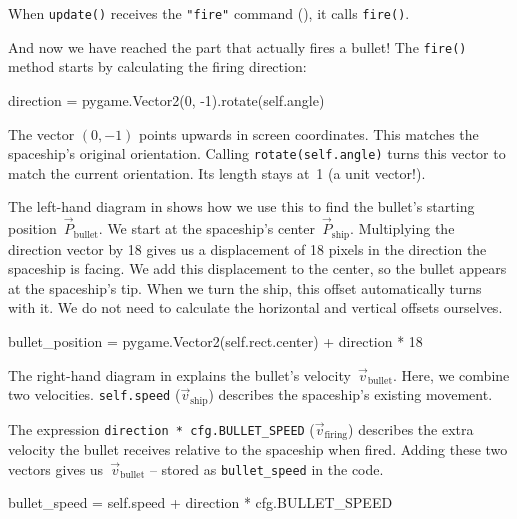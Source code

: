 
When \texttt{update()} receives the \verb#"fire"# command (), it calls \texttt{fire()}.


And now we have reached the part that actually fires a bullet! The \texttt{fire()} method starts by calculating the firing direction:
\begin{codebox}
	direction = pygame.Vector2(0, -1).rotate(self.angle)
\end{codebox}

The vector $(0, -1)$ points upwards in screen coordinates. This matches the spaceship's original orientation. Calling \texttt{rotate(self.angle)} turns this vector to match the current orientation. Its length stays at~1 (a unit vector!).

The left-hand diagram in  shows how we use this to find the bullet's starting position~$\vec{P}_{\mathrm{bullet}}$. We start at the spaceship's center~$\vec{P}_{\mathrm{ship}}$. Multiplying the direction vector by 18 gives us a displacement of 18 pixels in the direction the spaceship is facing. We add this displacement to the center, so the bullet appears at the spaceship's tip. When we turn the ship, this offset automatically turns with it. We do not need to calculate the horizontal and vertical offsets ourselves.
\begin{codebox}
	bullet_position = pygame.Vector2(self.rect.center) + direction * 18
\end{codebox}

The right-hand diagram in  explains the bullet's velocity~$\vec{v}_{\mathrm{bullet}}$. Here, we combine two velocities. \texttt{self.speed} ($\vec{v}_{\mathrm{ship}}$) describes the spaceship's existing movement.

The expression \texttt{direction * cfg.BULLET\_SPEED} ($\vec{v}_{\mathrm{firing}}$) describes the extra velocity the bullet receives relative to the spaceship when fired. Adding these two vectors gives us~$\vec{v}_{\mathrm{bullet}}$ -- stored as \texttt{bullet\_speed} in the code.
\begin{codebox}
	bullet_speed = self.speed + direction * cfg.BULLET_SPEED
\end{codebox}

